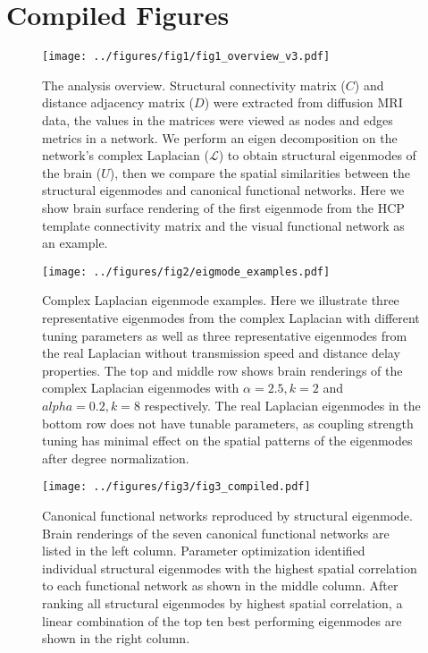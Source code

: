 \documentclass{article}
\begin{document}
\section{Compiled Figures}

\begin{figure}[ht]
  \centering
  \texttt{[image: ../figures/fig1/fig1\_overview\_v3.pdf]}
  \caption{The analysis overview. Structural connectivity matrix ($C$) and distance adjacency matrix ($D$) were extracted from diffusion MRI data, the values in the matrices were viewed as nodes and edges metrics in a network. We perform an eigen decomposition on the network's complex Laplacian ($\mathcal{L}$) to obtain structural eigenmodes of the brain ($U$), then we compare the spatial similarities between the structural eigenmodes and canonical functional networks. Here we show brain surface rendering of the first eigenmode from the HCP template connectivity matrix and the visual functional network as an example.}
  \label{fig:fig1}
\end{figure}

\begin{figure}[ht]
 \centering
 \texttt{[image: ../figures/fig2/eigmode\_examples.pdf]}
 \caption{Complex Laplacian eigenmode examples. Here we illustrate three representative eigenmodes from the complex Laplacian with different tuning parameters as well as three representative eigenmodes from the real Laplacian without transmission speed and distance delay properties. The top and middle row shows brain renderings of the complex Laplacian eigenmodes with {$\alpha = 2.5, k = 2$} and {$alpha = 0.2, k = 8$} respectively. The real Laplacian eigenmodes in the bottom row does not have tunable parameters, as coupling strength tuning has minimal effect on the spatial patterns of the eigenmodes after degree normalization.}
 \label{fig:fig2}
\end{figure}

\begin{figure}[ht]
 \centering
 \texttt{[image: ../figures/fig3/fig3\_compiled.pdf]}
 \caption{Canonical functional networks reproduced by structural eigenmode. Brain renderings of the seven canonical functional networks are listed in the left column. Parameter optimization identified individual structural eigenmodes with the highest spatial correlation to each functional network as shown in the middle column. After ranking all structural eigenmodes by highest spatial correlation, a linear combination of the top ten best performing eigenmodes are shown in the right column.}
 \label{fig:fig3}
\end{figure}
\end{document}
